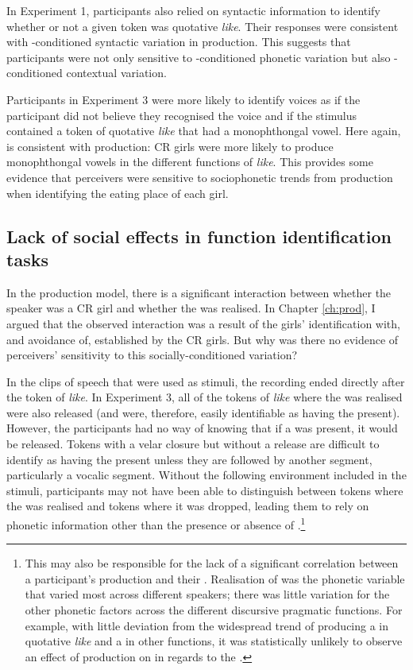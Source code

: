 \largerpage
In Experiment 1, participants also relied on syntactic information to identify whether or not a given token was quotative \textit{like}. Their responses were consistent with -conditioned syntactic variation in production. This suggests that participants were not only sensitive to -conditioned phonetic variation but also -conditioned contextual variation.

Participants in Experiment 3 were more likely to identify voices as  if the participant did not believe they recognised the voice and if the stimulus contained a token of quotative \textit{like} that had a monophthongal vowel. Here again,  is consistent with production: CR girls were more likely to produce monophthongal vowels in the different functions of \textit{like}. This provides some evidence that perceivers were sensitive to sociophonetic trends from production when identifying the eating place of each girl.


\subsection{Lack of social effects in function identification tasks}

In the pro\-duction model, there is a signif\-icant inter\-action be\-tween whe\-ther the speaker was a CR girl and whether the  was realised. In Chapter \ref{ch:prod}, I argued that the observed interaction was a result of the girls' identification with, and avoidance of,  established by the CR girls. But why was there no evidence of perceivers' sensitivity to this socially-conditioned variation?

In the clips of speech that were used as stimuli, the recording ended directly after the token of \textit{like}. In Experiment 3, all of the tokens of \textit{like} where the  was realised were also released (and were, therefore, easily identifiable as having the  present). However, the participants had no way of knowing that if a  was present, it would be released. Tokens with a velar closure but without a release are difficult to identify as having the  present unless they are followed by another segment, particularly a vocalic segment. Without the following environment included in the stimuli, participants may not have been able to distinguish between tokens where the  was realised and tokens where it was dropped, leading them to rely on phonetic information other than the presence or absence of .\footnote{This may also be responsible for the lack of a significant correlation between a participant's production and their . Realisation of  was the phonetic variable that varied most across different speakers; there was little variation for the other phonetic factors across the different discursive pragmatic functions. For example, with little deviation from the widespread trend of producing a  in quotative \textit{like} and a  in other functions, it was statistically unlikely to observe an effect of production on  in regards to the .}


